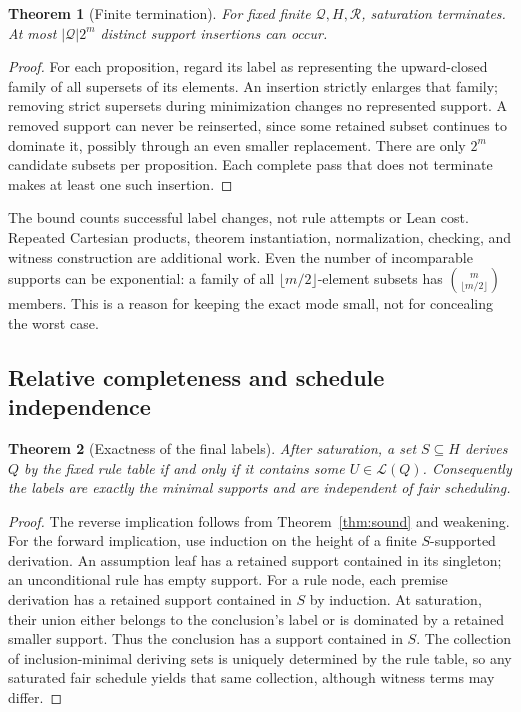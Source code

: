 \documentclass[11pt,a4paper]{article}
\newcommand{\Supp}{\mathcal L}\newcommand{\Front}{\mathcal F}
\numberwithin{equation}{section}
\newtheorem{theorem}{Theorem}[section]
\theoremstyle{definition}\newtheorem{definition}[theorem]{Definition}
\theoremstyle{remark}\newtheorem{remark}[theorem]{Remark}
\begin{document}
\begin{theorem}[Finite termination]\label{thm:termination}
For fixed finite \(\mathcal Q,H,\mathcal R\), saturation terminates. At most
\(|\mathcal Q|2^m\) distinct support insertions can occur.
\end{theorem}
\begin{proof}
For each proposition, regard its label as representing the upward-closed
family of all supersets of its elements. An insertion strictly enlarges that
family; removing strict supersets during minimization changes no represented
support. A removed support can never be reinserted, since some retained subset
continues to dominate it, possibly through an even smaller replacement.
There are only \(2^m\) candidate subsets per proposition. Each complete pass
that does not terminate makes at least one such insertion.
\end{proof}

The bound counts successful label changes, not rule attempts or Lean cost.
Repeated Cartesian products, theorem instantiation, normalization, checking,
and witness construction are additional work. Even the number of incomparable
supports can be exponential: a family of all \(\lfloor m/2\rfloor\)-element
subsets has \(\binom m{\lfloor m/2\rfloor}\) members. This is a reason for
keeping the exact mode small, not for concealing the worst case.

\subsection{Relative completeness and schedule independence}
\begin{theorem}[Exactness of the final labels]\label{thm:complete}
After saturation, a set \(S\subseteq H\) derives \(Q\) by the fixed rule table
if and only if it contains some \(U\in\Supp(Q)\). Consequently the labels
are exactly the minimal supports and are independent of fair scheduling.
\end{theorem}
\begin{proof}
The reverse implication follows from Theorem~\ref{thm:sound} and weakening.
For the forward implication, use induction on the height of a finite
\(S\)-supported derivation. An assumption leaf has a retained support contained
in its singleton; an unconditional rule has empty support. For a rule node,
each premise derivation has a retained support contained in \(S\) by induction.
At saturation, their union either belongs to the conclusion's label or is
dominated by a retained smaller support. Thus the conclusion has a support
contained in \(S\). The collection of inclusion-minimal deriving sets is
uniquely determined by the rule table, so any saturated fair schedule yields
that same collection, although witness terms may differ.
\end{proof}
\end{document}
